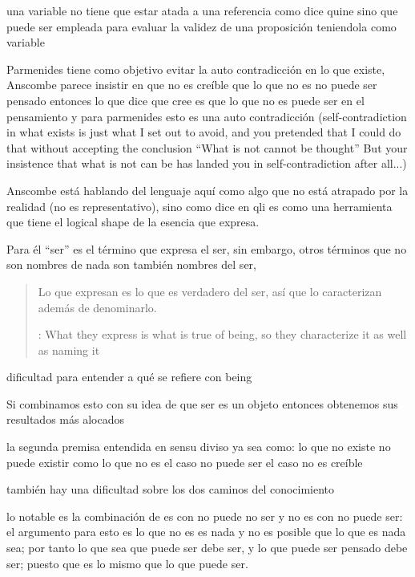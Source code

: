 una variable no tiene que estar atada a una referencia como dice quine sino que puede ser empleada para evaluar la validez de una proposición teniendola como variable

Parmenides tiene como objetivo evitar la auto contradicción en lo que existe, Anscombe parece insistir en que no es creíble que lo que no es no puede ser pensado entonces lo que dice que cree es que lo que no es puede ser en el pensamiento y para parmenides esto es una auto contradicción (self-contradiction in what exists is just what I set out to avoid, and you pretended that I could do that without accepting the conclusion ``What is not cannot be thought'' But your insistence that what is not can be has landed you in self-contradiction after all...)

Anscombe está hablando del lenguaje aquí como algo que no está atrapado por la realidad (no es representativo), sino como dice en qli es como una herramienta que tiene el logical shape de la esencia que expresa.

Para él ``ser'' es el término que expresa el ser, sin embargo, otros términos que no son nombres de nada son también nombres del ser, \blockquote[{\cite[x]{anscombe1981parmenides}}: What they express is what is true of being, so they characterize it as well as naming it]{Lo que expresan es lo que es verdadero del ser, así que lo caracterizan además de denominarlo.}

dificultad para entender a qué se refiere con being

Si combinamos esto con su idea de que ser es un objeto entonces obtenemos sus resultados más alocados

la segunda premisa entendida en sensu diviso ya sea como: lo que no existe no puede existir como lo que no es el caso no puede ser el caso no es creíble


también hay una dificultad sobre los dos caminos del conocimiento

lo notable es la combinación de es con no puede no ser y no es con no puede ser: el argumento para esto es lo que no es es nada y no es posible que lo que es nada sea; por tanto lo que sea que puede ser debe ser, y lo que puede ser pensado debe ser; puesto que es lo mismo que lo que puede ser.


